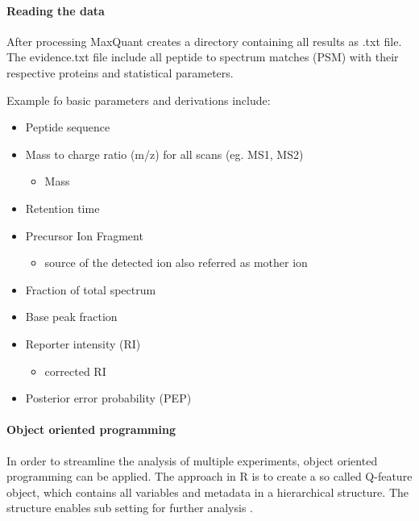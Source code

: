 \documentclass[
  11pt,
]{article}
\providecommand{\tightlist}{%
  \setlength{\itemsep}{0pt}\setlength{\parskip}{0pt}}
\begin{document}
\hypertarget{reading-the-data}{%
\paragraph{Reading the data}\label{reading-the-data}}

After processing MaxQuant creates a directory containing all results as
.txt file. The evidence.txt file include all peptide to spectrum matches
(PSM) with their respective proteins and statistical parameters.

Example fo basic parameters and derivations include:

\begin{itemize}
\tightlist
\item
  Peptide sequence
\item
  Mass to charge ratio (m/z) for all scans (eg. MS1, MS2)

  \begin{itemize}
  \tightlist
  \item
    Mass
  \end{itemize}
\item
  Retention time
\item
  Precursor Ion Fragment

  \begin{itemize}
  \tightlist
  \item
    source of the detected ion also referred as mother ion
  \end{itemize}
\item
  Fraction of total spectrum
\item
  Base peak fraction
\item
  Reporter intensity (RI)

  \begin{itemize}
  \tightlist
  \item
    corrected RI
  \end{itemize}
\item
  Posterior error probability (PEP)
\end{itemize}

\hypertarget{object-oriented-programming}{%
\paragraph{Object oriented
programming}\label{object-oriented-programming}}

In order to streamline the analysis of multiple experiments, object
oriented programming can be applied. The approach in R is to create a so
called Q-feature object, which contains all variables and metadata in a
hierarchical structure. The structure enables sub setting for further
analysis \citep{Vanderaa2021}.
\end{document}

